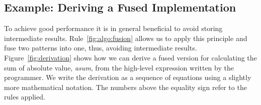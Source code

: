 

\subsection{Example: Deriving a Fused Implementation}
\label{sec:example}





To achieve good performance it is in general beneficial to avoid storing intermediate results.
Rule~\ref{fig:algo:fusion} allows us to apply this principle and fuse two patterns into one, thus, avoiding intermediate results.
Figure~\ref{fig:derivation} shows how we can derive a fused version for calculating the sum of absolute value, \emph{asum}, from the high-level expression written by the programmer.
We write the derivation as a sequence of equations using a slightly more mathematical notation.
The numbers above the equality sign refer to the rules applied.

